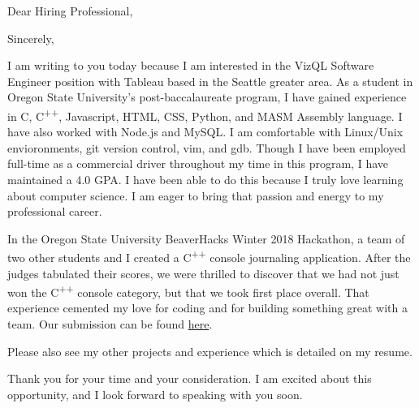 \documentclass[11pt,a4paper,sans]{moderncv}        %
\begin{document}
\date{August 22, 2019}
\opening{Dear Hiring Professional,}
\closing{Sincerely,}
\makelettertitle

I am writing to you today because I am interested in the VizQL Software Engineer position with Tableau based in the Seattle greater area. As a student in Oregon State University's post-baccalaureate program, I have gained experience in C, C\textsuperscript{++}, Javascript, HTML, CSS, Python, and MASM Assembly language. I have also worked with Node.js and MySQL. I am comfortable with Linux/Unix envioronments, git version control, vim, and gdb. Though I have been employed full-time as a commercial driver throughout my time in this program, I have maintained a 4.0 GPA. I have been able to do this because I truly love learning about computer science. I am eager to bring that passion and energy to my professional career.

In the Oregon State University BeaverHacks Winter 2018 Hackathon, a team of two other students and I created a C\textsuperscript{++} console journaling application. After the judges tabulated their scores, we were thrilled to discover that we had not just won the C\textsuperscript{++} console category, but that we took first place overall. That experience cemented my love for coding and for building something great with a team. Our submission can be found \textcolor{red}{\href{https://www.github.com/jkbartos/rewind-revitalize}{here}}. 

Please also see my other projects and experience which is detailed on my resume.

Thank you for your time and your consideration. I am excited about this opportunity, and I look forward to speaking with you soon.



\makeletterclosing
\end{document}
